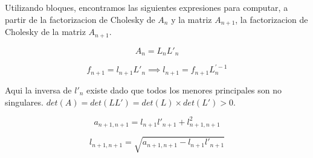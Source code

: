 \documentclass[10pt,a4paper]{article}
\begin{document}
Utilizando bloques, encontramos las siguientes expresiones para computar, a partir de la factorizacion de Cholesky de $A_n$ y la matriz $A_{n+1}$, la factorizacion de Cholesky de la matriz $A_{n+1}$.

\begin{equation}
A_n = L_n L'_n
\end{equation}

\begin{equation}
f_{n+1} = l_{n+1} L'_n \implies l_{n+1} = f_{n+1} L_n^{'-1}
\end{equation}

Aqui la inversa de $l'_n$ existe dado que todos los menores principales son no singulares. $det(A) = det(LL') = det(L) \times det(L') > 0$.

\begin{equation}
a_{n+1,n+1} = l_{n+1} l'_{n+1} + l_{n+1,n+1}^2
\end{equation}

\begin{equation}
l_{n+1,n+1} = \sqrt{a_{n+1,n+1} - l_{n+1} l'_{n+1}}
\end{equation}
\end{document}
